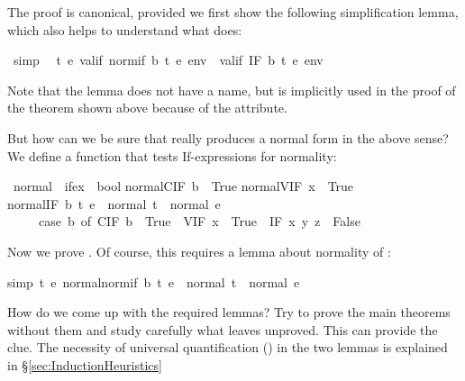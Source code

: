 \begin{isabellebody}
\begin{isamarkuptext}%
\noindent
The proof is canonical, provided we first show the following simplification
lemma, which also helps to understand what  does:%
\end{isamarkuptext}%
\ {\isacharbrackleft}simp{\isacharbrackright}{\isacharcolon}\isanewline
\ \ {\isachardoublequote}{\isasymforall}t\ e{\isachardot}\ valif\ {\isacharparenleft}normif\ b\ t\ e{\isacharparenright}\ env\ {\isacharequal}\ valif\ {\isacharparenleft}IF\ b\ t\ e{\isacharparenright}\ env{\isachardoublequote}%
\begin{isamarkuptext}%
\noindent
Note that the lemma does not have a name, but is implicitly used in the proof
of the theorem shown above because of the  attribute.

But how can we be sure that  really produces a normal form in
the above sense? We define a function that tests If-expressions for normality:%
\end{isamarkuptext}%
\ normal\ {\isacharcolon}{\isacharcolon}\ {\isachardoublequote}ifex\ {\isasymRightarrow}\ bool{\isachardoublequote}\isanewline
{}\isanewline
{\isachardoublequote}normal{\isacharparenleft}CIF\ b{\isacharparenright}\ {\isacharequal}\ True{\isachardoublequote}\isanewline
{\isachardoublequote}normal{\isacharparenleft}VIF\ x{\isacharparenright}\ {\isacharequal}\ True{\isachardoublequote}\isanewline
{\isachardoublequote}normal{\isacharparenleft}IF\ b\ t\ e{\isacharparenright}\ {\isacharequal}\ {\isacharparenleft}normal\ t\ {\isasymand}\ normal\ e\ {\isasymand}\isanewline
\ \ \ \ \ {\isacharparenleft}case\ b\ of\ CIF\ b\ {\isasymRightarrow}\ True\ {\isacharbar}\ VIF\ x\ {\isasymRightarrow}\ True\ {\isacharbar}\ IF\ x\ y\ z\ {\isasymRightarrow}\ False{\isacharparenright}{\isacharparenright}{\isachardoublequote}%
\begin{isamarkuptext}%
\noindent
Now we prove . Of course, this requires a lemma about
normality of :%
\end{isamarkuptext}%
simp{\isacharbrackright}{\isacharcolon}\ {\isachardoublequote}{\isasymforall}t\ e{\isachardot}\ normal{\isacharparenleft}normif\ b\ t\ e{\isacharparenright}\ {\isacharequal}\ {\isacharparenleft}normal\ t\ {\isasymand}\ normal\ e{\isacharparenright}{\isachardoublequote}%
\begin{isamarkuptext}%
\medskip
How do we come up with the required lemmas? Try to prove the main theorems
without them and study carefully what  leaves unproved. This 
can provide the clue.  The necessity of universal quantification
() in the two lemmas is explained in
\S\ref{sec:InductionHeuristics}


\end{isamarkuptext}
\end{isabellebody}
